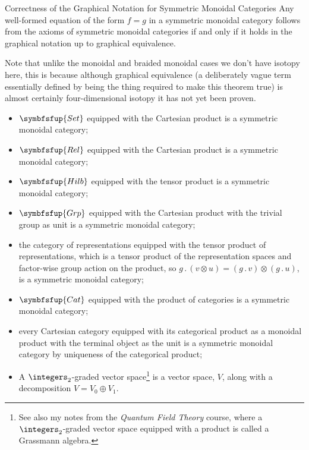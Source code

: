 \documentclass[fleqn]{NotesClass}
\makeatletter
\newcommand*{\course}[1]{\textit{#1}}
\newcommand{\c@egory}[1]{\symbfsfup{#1}}
\newcommand{\Set}{\c@egory{Set}}
\newcommand{\Rel}{\c@egory{Rel}}
\newcommand{\Hilb}{\c@egory{Hilb}}
\newcommand{\Grp}{\c@egory{Grp}}
\newcommand{\Cat}{\c@egory{Cat}}
\makeatother
\begin{document}
    \begin{thm}{Correctness of the Graphical Notation for Symmetric Monoidal Categories}{}
        Any well-formed equation of the form \(f = g\) in a symmetric monoidal category follows from the axioms of symmetric monoidal categories if and only if it holds in the graphical notation up to graphical equivalence.
    \end{thm}
    
    Note that unlike the monoidal and braided monoidal cases we don't have isotopy here, this is because although graphical equivalence (a deliberately vague term essentially defined by being the thing required to make this theorem true) is almost certainly four-dimensional isotopy it has not yet been proven.
    
    \begin{exm}{}{}
        \begin{itemize}
            \item \(\Set\) equipped with the Cartesian product is a symmetric monoidal category;
            \item \(\Rel\) equipped with the Cartesian product is a symmetric monoidal category;
            \item \(\Hilb\) equipped with the tensor product is a symmetric monoidal category;
            \item \(\Grp\) equipped with the Cartesian product with the trivial group as unit is a symmetric monoidal category;
            \item the category of representations equipped with the tensor product of representations, which is a tensor product of the representation spaces and factor-wise group action on the product, so \(g \mathbin{.} (v \otimes u) = (g \mathbin{.} v) \otimes (g \mathbin{.} u)\), is a symmetric monoidal category;
            \item \(\Cat\) equipped with the product of categories is a symmetric monoidal category;
            \item every Cartesian category equipped with its categorical product as a monoidal product with the terminal object as the unit is a symmetric monoidal category by uniqueness of the categorical product;
            \item A \(\integers_2\)-graded vector space\footnote{See also my notes from the \course{Quantum Field Theory} course, where a \(\integers_2\)-graded vector space equipped with a product is called a Grassmann algebra.} is a vector space, \(V\), along with a decomposition \(V = V_0 \oplus V_1\).

\end{itemize}
\end{exm}
\end{document}
